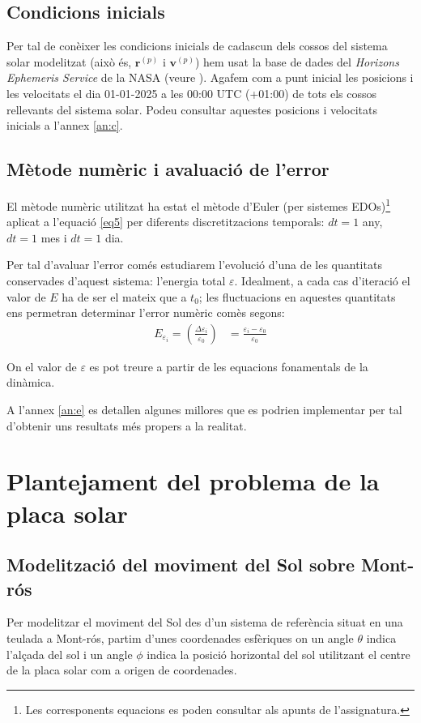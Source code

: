 \documentclass[10pt, twoside, a4paper]{article}
\begin{document}
\subsection{Condicions inicials}
Per tal de conèixer les condicions inicials de cadascun dels cossos del sistema solar modelitzat (això és, $\mathbf{r}^{(p)}$ i $\mathbf{v}^{(p)}$) hem usat la base de dades del \textit{Horizons Ephemeris Service} de la NASA (veure \cite{ref3}). Agafem com a punt inicial les posicions i les velocitats el dia 01-01-2025 a les 00:00 UTC (+01:00) de tots els cossos rellevants del sistema solar. Podeu consultar aquestes posicions i velocitats inicials a l'annex \ref{an:c}.

\subsection{Mètode numèric i avaluació de l'error}
El mètode numèric utilitzat ha estat el mètode d'Euler (per sistemes EDOs)\footnote{Les corresponents equacions es poden consultar als apunts de l'assignatura.} aplicat a l'equació \eqref{eq5} per diferents discretitzacions temporals: $dt = 1$ any, $dt = 1$ mes i $dt = 1$ dia.

Per tal d'avaluar l'error comés estudiarem l'evolució d'una de les quantitats conservades d'aquest sistema: l'energia total $\varepsilon$. Idealment, a cada cas d'iteració el valor de $E$ ha de ser el mateix que a $t_0$; les fluctuacions en aquestes quantitats ens permetran determinar l'error numèric comès segons:
\begin{align}
    E_{\varepsilon_i} = \left( \frac{\Delta \varepsilon_i}{\varepsilon_0} \right) & = \frac{\varepsilon_i - \varepsilon_0}{\varepsilon_0} 
\end{align}

On el valor de $\varepsilon$ es pot treure a partir de les equacions fonamentals de la dinàmica.

A l'annex \ref{an:e} es detallen algunes millores que es podrien implementar per tal d'obtenir uns resultats més propers a la realitat.

\section{Plantejament del problema de la placa solar}

\subsection{Modelització del moviment del Sol sobre Mont-rós}
Per modelitzar el moviment del Sol des d'un sistema de referència situat en una teulada a Mont-rós, partim d'unes coordenades esfèriques on un angle $\theta$ indica l'alçada del sol i un angle $\phi$ indica la posició horizontal del sol utilitzant el centre de la placa solar com a origen de coordenades.
\end{document}
